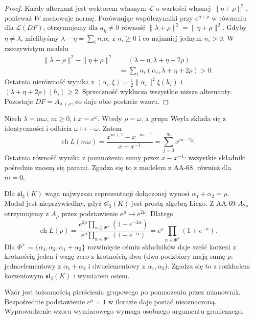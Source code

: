 \begin{proof}
Każdy alternant jest wektorem własnym $\mathcal L$ o wartości własnej $\|\eta+\rho\|^2$, ponieważ $W$ zachowuje normę. Porównując współczynniki przy $e^{\eta+\rho}$ w równaniu dla $\mathcal L(DF)$, otrzymujemy dla $a_\eta\ne0$ równość $\|\lambda+\rho\|^2=\|\eta+\rho\|^2$. Gdyby $\eta\ne\lambda$, mielibyśmy $\lambda-\eta=\sum_i n_i\alpha_i$ z $n_i\ge0$ i co najmniej jednym $n_i>0$. W rzeczywistym modelu
\[
 \begin{aligned}
 \|\lambda+\rho\|^2-\|\eta+\rho\|^2
 &= (\lambda-\eta,\lambda+\eta+2\rho)\\
 &=\sum_i n_i(\alpha_i,\lambda+\eta+2\rho)>0.
 \end{aligned}
\]
Ostatnia nierówność wynika z $(\alpha_i,\xi)=\frac12\|\alpha_i\|^2\xi(h_i)$ i $(\lambda+\eta+2\rho)(h_i)\ge2$. Sprzeczność wyklucza wszystkie niższe alternanty. Pozostaje $DF=A_{\lambda+\rho}$, co daje obie postacie wzoru.
\end{proof}

\begin{przyklad}[Typ $A_1$]
\label{aa:prz:weyl-character-a1}
Niech $\lambda=m\omega$, $m\ge0$, i $x=e^\omega$. Wtedy $\rho=\omega$, a grupa Weyla składa się z identyczności i odbicia $\omega\mapsto-\omega$. Zatem
\[
 \operatorname{ch}L(m\omega)
 =\frac{x^{m+1}-x^{-m-1}}{x-x^{-1}}
 =\sum_{j=0}^m x^{m-2j}.
\]
Ostatnia równość wynika z pomnożenia sumy przez $x-x^{-1}$: wszystkie składniki pośrednie znoszą się parami. Zgadza się to z modelem z AA-68, również dla $m=0$.
\end{przyklad}

\begin{przyklad}
\label{aa:prz:weyl-character-a2}
Dla $\mathfrak{sl}_3(K)$ waga najwyższa reprezentacji dołączonej wynosi $\alpha_1+\alpha_2=\rho$. Moduł jest nieprzywiedlny, gdyż $\mathfrak{sl}_3(K)$ jest prostą algebrą Liego. Z AA-69
$A_{2\rho}$ otrzymujemy z $A_\rho$ przez podstawienie $e^\mu\mapsto e^{2\mu}$. Dlatego
\[
 \operatorname{ch}L(\rho)=
 \frac{e^{2\rho}\prod_{\alpha\in\Phi^+}(1-e^{-2\alpha})}
      {e^\rho\prod_{\alpha\in\Phi^+}(1-e^{-\alpha})}
 =e^\rho\prod_{\alpha\in\Phi^+}(1+e^{-\alpha}).
\]
Dla $\Phi^+=\{\alpha_1,\alpha_2,\alpha_1+\alpha_2\}$ rozwinięcie ośmiu składników daje sześć korzeni z krotnością jeden i wagę zero z krotnością dwa (dwa podzbiory mają sumę $\rho$: jednoelementowy z $\alpha_1+\alpha_2$ i dwuelementowy z $\alpha_1,\alpha_2$). Zgadza się to z rozkładem korzeniowym $\mathfrak{sl}_3(K)$ i wymiarem osiem.
\end{przyklad}

Wzór jest tożsamością pierścienia grupowego po pomnożeniu przez mianownik. Bezpośrednie podstawienie $e^\mu=1$ w ilorazie daje postać nieoznaczoną. Wyprowadzenie wzoru wymiarowego wymaga osobnego argumentu granicznego.
